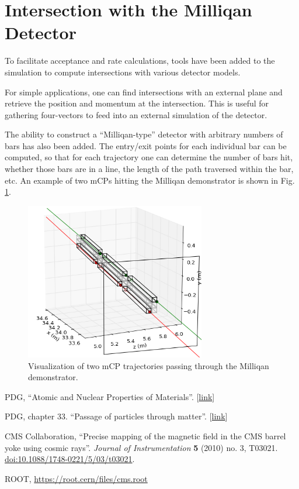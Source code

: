 \documentclass[12pt]{article}
\begin{document}
\section{Intersection with the Milliqan Detector}
To facilitate acceptance and rate calculations, tools have been added to the simulation to compute intersections with
various detector models.

For simple applications, one can find intersections with an external plane and retrieve the position and momentum
at the intersection. This is useful for gathering four-vectors to feed into an external simulation of the detector.

The ability to construct a ``Milliqan-type'' detector with arbitrary numbers of bars has also been added.
The entry/exit points for each individual bar can be computed, so that for each trajectory one can determine
the number of bars hit, whether those bars are in a line, the length of the path traversed within the bar, etc.
An example of two mCPs hitting the Milliqan demonstrator is shown in Fig. \ref{fig:traj_vis}.

\begin{figure}
\centering
\includegraphics[width=0.7\textwidth]{plots/traj_vis.png}
\caption{Visualization of two mCP trajectories passing through the Milliqan demonstrator.}
\label{fig:traj_vis}
\end{figure}


\begin{thebibliography}{1}

  PDG, ``Atomic and Nuclear Properties of Materials''.
[\href{http://pdg.lbl.gov/2019/AtomicNuclearProperties/index.html}{link}]

  PDG, chapter 33. ``Passage of particles through matter''.
[\href{http://pdg.lbl.gov/2019/reviews/rpp2018-rev-passage-particles-matter.pdf}{link}]

 CMS Collaboration, ``Precise mapping of the magnetic field in the CMS barrel yoke using cosmic rays''.
\emph{Journal of Instrumentation} {\bf 5} (2010) no. 3, T03021. \href{https://doi.org/10.1088\%2F1748-0221\%2F5\%2F03\%2Ft03021}{doi:10.1088/1748-0221/5/03/t03021}.

 ROOT, \href{https://root.cern/files/cms.root}{https://root.cern/files/cms.root}

\end{thebibliography}
  
\end{document}
